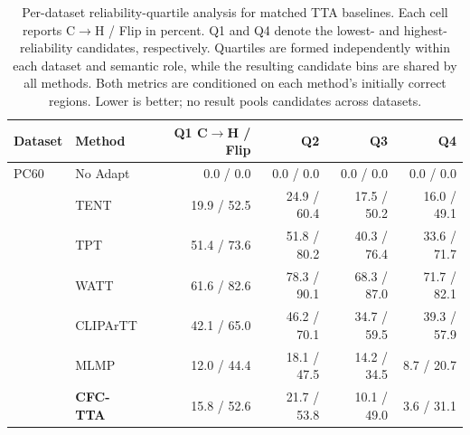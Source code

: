 \begin{table}[t]
\centering
\scriptsize
\setlength{\tabcolsep}{4pt}
\caption{Per-dataset reliability-quartile analysis for matched TTA baselines. Each cell reports C$\rightarrow$H / Flip in percent. Q1 and Q4 denote the lowest- and highest-reliability candidates, respectively. Quartiles are formed independently within each dataset and semantic role, while the resulting candidate bins are shared by all methods. Both metrics are conditioned on each method's initially correct regions. Lower is better; no result pools candidates across datasets.}
\label{tab:baseline-reliability-quartiles-per-dataset}
\begin{tabular}{llrrrr}
\toprule
Dataset & Method & Q1 C$\rightarrow$H / Flip & Q2 & Q3 & Q4 \\
\midrule
PC60 & No Adapt & 0.0 / 0.0 & 0.0 / 0.0 & 0.0 / 0.0 & 0.0 / 0.0 \\
 & TENT & 19.9 / 52.5 & 24.9 / 60.4 & 17.5 / 50.2 & 16.0 / 49.1 \\
 & TPT & 51.4 / 73.6 & 51.8 / 80.2 & 40.3 / 76.4 & 33.6 / 71.7 \\
 & WATT & 61.6 / 82.6 & 78.3 / 90.1 & 68.3 / 87.0 & 71.7 / 82.1 \\
 & CLIPArTT & 42.1 / 65.0 & 46.2 / 70.1 & 34.7 / 59.5 & 39.3 / 57.9 \\
 & MLMP & 12.0 / 44.4 & 18.1 / 47.5 & 14.2 / 34.5 & 8.7 / 20.7 \\
 & \textbf{CFC-TTA} & 15.8 / 52.6 & 21.7 / 53.8 & 10.1 / 49.0 & 3.6 / 31.1 \\
\bottomrule
\end{tabular}
\end{table}
